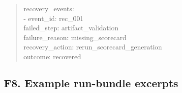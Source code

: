 \begin{quote}
recovery\_\allowbreak{}events:\\
- event\_\allowbreak{}id: rec\_\allowbreak{}001\\
failed\_\allowbreak{}step: artifact\_\allowbreak{}validation\\
failure\_\allowbreak{}reason: missing\_\allowbreak{}scorecard\\
recovery\_\allowbreak{}action: rerun\_\allowbreak{}scorecard\_\allowbreak{}generation\\
outcome: recovered
\end{quote}

\subsection{\texorpdfstring{\textbf{F8. Example run-bundle excerpts}}{F8. Example run-bundle excerpts}}\label{f8.-example-run-bundle-excerpts}

